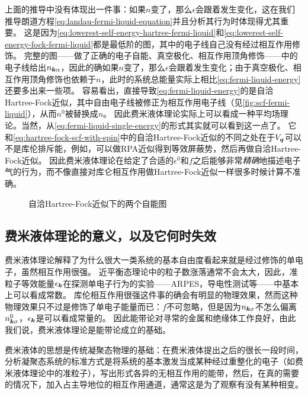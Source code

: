上面的推导中没有体现出一件事：如果$n$变了，那么$\epsilon$会跟着发生变化，这在我们推导朗道方程\eqref{eq:landau-fermi-liquid-equation}并且分析其行为时体现得尤其重要。
这是因为\eqref{eq:lowerest-self-energy-hartree-fermi-liquid}和\eqref{eq:lowerest-self-energy-fock-fermi-liquid}都是最低阶的图，其中的电子线自己没有经过相互作用修饰。
完整的图——做了正确的电子自能、真空极化、相互作用顶角修饰——中的电子线给出$n_{\vb*{k} \alpha}$，因此的确如果$n$变了，那么$\epsilon$会跟着发生变化；由于真空极化、相互作用顶角修饰也依赖于$n$，此时的系统总能量实际上相比\eqref{eq:fermi-liquid-energy}还要多出来一些项。
容易看出，直接导致\eqref{eq:fermi-liquid-energy}的是自洽Hartree-Fock近似，其中自由电子线被修正为相互作用电子线（见\autoref{fig:scf-fermi-liquid}），从而$n^0$被替换成$n$。
因此费米液体理论实际上可以看成一种平均场理论。当然，从\eqref{eq:fermi-liquid-single-energy}的形式其实就可以看到这一点了。
它和\eqref{eq:hartree-fock-scf-with-spin}中的自洽Hartree-Fock近似的不同之处在于$V_{\vb*{q}}$可以不是库伦排斥能，例如，可以做RPA近似得到等效屏蔽势，然后再做自洽Hartree-Fock近似。
因此费米液体理论在给定了合适的$\epsilon^0$和$f$之后能够非常\emph{精确}地描述电子气的行为，而不像直接对库仑相互作用做Hartree-Fock近似一样很多时候计算不准确。

\begin{figure}
    \centering
    
    \caption{自洽Hartree-Fock近似下的两个自能图}
    \label{fig:scf-fermi-liquid}
\end{figure}

\subsection{费米液体理论的意义，以及它何时失效}

费米液体理论解释了为什么很大一类系统的基本自由度看起来就是经过修饰的单电子，虽然相互作用很强。
近平衡态理论中的粒子数涨落通常不会太大，因此，准粒子等效能量$\epsilon_{\vb*{k}}$在探测单电子行为的实验——ARPES，导电性测试等——中基本上可以看成常数。
库伦相互作用很强这件事的确会有明显的物理效果，然而这种物理效果只不过是修饰了单电子能量而已：$f$不可忽略，但是因为$n_{\vb*{k} \sigma}$不怎么偏离$n^0_{\vb*{k} \sigma}$，$\epsilon_{\vb*{k}}$是可以看成常量的。
因此能带论对寻常的金属和绝缘体工作良好，由此我们说，费米液体理论是能带论成立的基础。

费米液体的思想是传统凝聚态物理的基础：在费米液体提出之后的很长一段时间，分析凝聚态系统的标准方式是将系统的基本激发当成某种经过重整化的电子（如费米液体理论中的准粒子），写出形式各异的无相互作用的能带，然后，在真的需要的情况下，加入占主导地位的相互作用通道，通常这是为了观察有没有某种相变。

